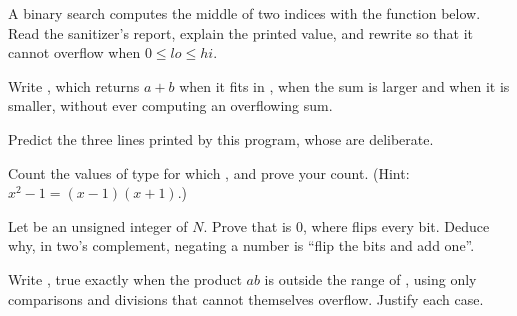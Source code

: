 \begin{exercise}[$\star\star$]\label{exo:b1:c-types-and-control:6}
A binary search computes the middle of two indices with the function  below. Read the sanitizer's
report, explain the printed value, and rewrite  so that it cannot overflow when $0 \leq lo \leq hi$.
\end{exercise}

\begin{exercise}[$\star\star$]\label{exo:b1:c-types-and-control:7}
Write , which returns $a + b$ when it fits in ,
 when the sum is larger and  when it is smaller, without ever computing an
overflowing sum.
\end{exercise}

\begin{exercise}[$\star\star$]\label{exo:b1:c-types-and-control:8}
Predict the three lines printed by this program, whose  are deliberate.
\end{exercise}

\begin{exercise}[$\star\star$]\label{exo:b1:c-types-and-control:9}
Count the values  of type  for which , and prove your count.
(Hint: $x^2 - 1 = (x-1)(x+1)$.)
\end{exercise}

\begin{exercise}[$\star\star\star$]\label{exo:b1:c-types-and-control:10}
Let  be an unsigned integer of  $N$. Prove that  is 0, where \code{~} flips every
bit. Deduce why, in two's complement, negating a number is ``flip the bits and add one''.
\end{exercise}

\begin{exercise}[$\star\star\star$]\label{exo:b1:c-types-and-control:11}
Write , true exactly when the product $ab$ is outside the range of
, using only comparisons and divisions that cannot themselves overflow. Justify each case.
\end{exercise}

